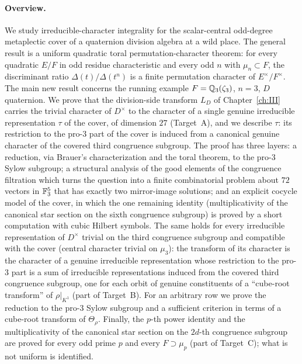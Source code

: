 \paragraph{Overview.} We study irreducible-character integrality for the scalar-central
odd-degree metaplectic cover of a quaternion division algebra at a
wild place.  The general result is a uniform quadratic toral
permutation-character theorem: for every quadratic $E/F$ in odd
residue characteristic and every odd $n$ with $\mu_n\subset F$, the
discriminant ratio $\Delta(t)/\Delta(t^n)$ is a finite permutation
character of $E^\times/F^\times$.  The main new result concerns the
running example $F=\mathbb Q_3(\zeta_3)$, $n=3$, $D$ quaternion.  We prove
that the division-side transform $L_D$ of Chapter~\ref{ch:III} carries the
trivial character of $D^\times$ to the character of a single genuine
irreducible representation $\tau$ of the cover, of dimension $27$
(Target~A), and we describe $\tau$: its restriction to the
pro-$3$ part of the cover is induced from a canonical genuine
character of the covered third congruence subgroup.  The proof has
three layers: a reduction, via Brauer's characterization and the
toral theorem, to the pro-$3$ Sylow subgroup; a structural analysis
of the good elements of the congruence filtration which turns the
question into a finite combinatorial problem about $72$ vectors in
$\mathbb F_3^5$ that has exactly two mirror-image solutions; and an
explicit cocycle model of the cover, in which the one remaining
identity (multiplicativity of the canonical star section on the sixth
congruence subgroup) is proved by a short computation with cubic
Hilbert symbols.  The same holds for every irreducible representation of $D^\times$
trivial on the third congruence subgroup and compatible with the cover
(central character trivial on $\mu_3$): the transform of its
character is the character of a genuine irreducible representation
whose restriction to the pro-$3$ part is a sum of irreducible
representations induced from the covered third congruence subgroup,
one for each orbit of genuine constituents of a ``cube-root transform''
of $\rho|_{K^1}$ (part of Target~B).  For an arbitrary row
we prove the reduction to the pro-$3$ Sylow subgroup and a sufficient
criterion in terms of a cube-root transform of $\Theta_\rho$.  Finally,
the $p$-th power identity and the multiplicativity of the canonical star
section on the $2d$-th congruence subgroup are proved for every odd prime
$p$ and every $F\supset\mu_p$ (part of Target~C); what is not uniform is
identified.

